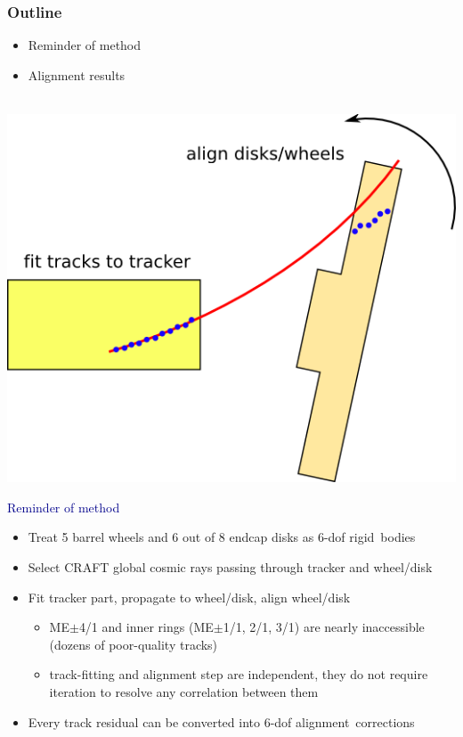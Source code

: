\documentclass[compress]{beamer}
\begin{document}
\begin{frame}
\frametitle{Outline}
\begin{itemize}
\item Reminder of method
\item Alignment results
\end{itemize}

\vspace{-1.5 cm}
\mbox{ } \hfill \includegraphics[width=0.4\linewidth]{globalMuon_alignment.png}

\vspace{-0.75 cm}
\hspace{-0.83 cm} \textcolor{darkblue}{\Large Reminder of method}

\vspace{0.25 cm}
\begin{itemize}
\item Treat 5 barrel wheels and 6 out of 8 endcap disks as 6-dof \mbox{rigid bodies\hspace{-1 cm}}
\item Select CRAFT global cosmic rays passing through tracker and wheel/disk
\item Fit tracker part, propagate to wheel/disk, align wheel/disk
\begin{itemize}
\item ME$\pm$4/1 and inner rings (ME$\pm$1/1, 2/1, 3/1) are nearly
  inaccessible (dozens of poor-quality tracks)
\item track-fitting and alignment step are independent, they do not require iteration to resolve any correlation between them
\end{itemize}
\item Every track residual can be converted into 6-dof \mbox{alignment corrections\hspace{-1 cm}}
\end{itemize}

\end{frame}

\end{document}
